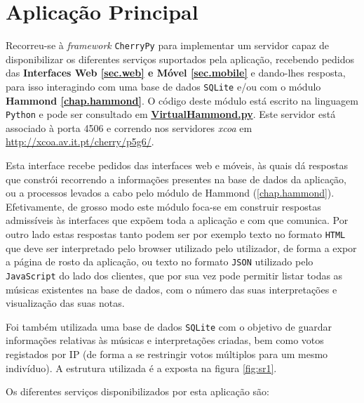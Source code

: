 \documentclass[a4paper,11pt,openright,oneside]{report}
\begin{document}
\chapter{Aplicação Principal}
\label{chap.mainapp}

Recorreu-se à \textit{framework} \verb|CherryPy| para implementar um servidor capaz de disponibilizar os diferentes serviços suportados pela aplicação, recebendo pedidos das \textbf{Interfaces Web \ref{sec.web} e Móvel \ref{sec.mobile}} e dando-lhes resposta, para isso interagindo com uma base de dados \verb|SQLite| e/ou com o módulo \textbf{Hammond \ref{chap.hammond}}. O código deste módulo está escrito na linguagem \verb|Python| e pode ser consultado em \href{../../MainApp/VirtualHammond.py}{\textbf{VirtualHammond.py}}. Este servidor está associado à porta 4506 e correndo nos servidores \textit{xcoa} em \url{http://xcoa.av.it.pt/cherry/p5g6/}.

Esta interface recebe pedidos das interfaces web e móveis, às quais dá respostas que constrói recorrendo a informações presentes na base de dados da aplicação, ou a processos levados a cabo pelo módulo de Hammond (\ref{chap.hammond}). Efetivamente, de grosso modo este módulo foca-se em construir respostas admissíveis às interfaces que expõem toda a aplicação e com que comunica. Por outro lado estas respostas tanto podem ser por exemplo texto no formato \verb|HTML| que deve ser interpretado pelo browser utilizado pelo utilizador, de forma a expor a página de rosto da aplicação, ou texto no formato \verb|JSON| utilizado pelo \verb|JavaScript| do lado dos clientes, que por sua vez pode permitir listar todas as músicas existentes na base de dados, com o número das suas interpretações e visualização das suas notas.

Foi também utilizada uma base de dados \verb|SQLite| com o objetivo de guardar informações relativas às músicas e interpretações criadas, bem como votos registados por IP (de forma a se restringir votos múltiplos para um mesmo indivíduo). A estrutura utilizada é a exposta na figura \ref{fig:sr1}.

Os diferentes serviços disponibilizados por esta aplicação são:
\end{document}
